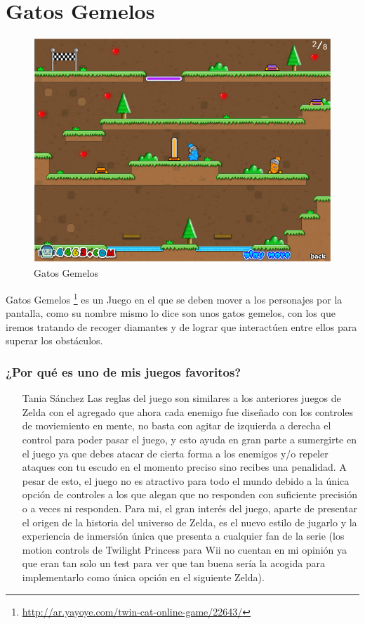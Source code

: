 \section{Gatos Gemelos}

\begin{figure}[htbp]
\begin{center}
\includegraphics[width=.60\textwidth]{./imagenes/gatos.png}
\caption{Gatos Gemelos}
\label{Gatos Gemelos}
\end{center}
\end{figure}
Gatos Gemelos \footnote{\url{http://ar.yayoye.com/twin-cat-online-game/22643/}} es un Juego en el que se deben mover a los personajes por la pantalla, como su nombre mismo lo dice son unos gatos gemelos, con los que iremos tratando de recoger diamantes y de lograr que interactúen entre ellos para superar los obstáculos.

\subsubsection{¿Por qué es uno de mis juegos favoritos?}
\begin{itemize}
\item[Tania Sánchez] Las reglas del juego son similares a los anteriores juegos de Zelda con el agregado que ahora cada enemigo fue diseñado con los controles de moviemiento en mente, no basta con agitar de izquierda a derecha el control para poder pasar el juego, y esto ayuda en gran parte a sumergirte en el juego ya que debes atacar de cierta forma a los enemigos y/o repeler ataques con tu escudo en el momento preciso sino recibes una penalidad. A pesar de esto, el juego no es atractivo para todo el mundo debido a la única opción de controles a los que alegan que no responden con suficiente precisión o a veces ni responden. Para mi, el gran interés del juego, aparte de presentar el origen de la historia del universo de Zelda, es el nuevo estilo de jugarlo y la experiencia de inmersión única que presenta a cualquier fan de la serie (los motion controls de Twilight Princess para Wii no cuentan en mi opinión ya que eran tan solo un test para ver que tan buena sería la acogida para implementarlo como única opción en el siguiente Zelda).
\end{itemize}